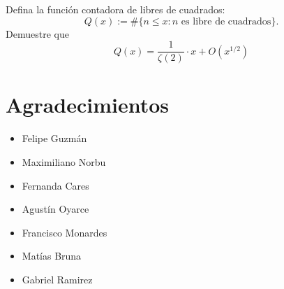 \begin{prob}
	Defina la función contadora de libres de cuadrados:
	\[Q(x):=\#\{n\leq x: n\text{ es libre de cuadrados}\}.\]
	Demuestre que
	\[Q(x)=\frac{1}{\zeta(2)}\cdot x+O(x^{1/2})\]
\end{prob}

\begin{sol}

\end{sol}

\section{Agradecimientos}
\begin{multicols}{3}
    \begin{itemize}
        \item Felipe Guzmán

        \item Maximiliano Norbu

        \item Fernanda Cares

        \item Agustín Oyarce

        \item Francisco Monardes

        \item Matías Bruna

        \item Gabriel Ramirez
    \end{itemize}
\end{multicols}



